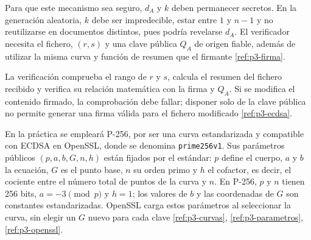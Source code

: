 Para que este mecanismo sea seguro, $d_A$ y $k$ deben permanecer secretos. En la generación aleatoria, $k$ debe ser impredecible, estar entre $1$ y $n-1$ y no reutilizarse en documentos distintos, pues podría revelarse $d_A$. El verificador necesita el fichero, $(r,s)$ y una clave pública $Q_A$ de origen fiable, además de utilizar la misma curva y función de resumen que el firmante \ref{ref:p3-firma}.

La verificación comprueba el rango de $r$ y $s$, calcula el resumen del fichero recibido y verifica su relación matemática con la firma y $Q_A$. Si se modifica el contenido firmado, la comprobación debe fallar; disponer solo de la clave pública no permite generar una firma válida para el fichero modificado \ref{ref:p3-ecdsa}.

En la práctica se empleará P-256, por ser una curva estandarizada y compatible con ECDSA en OpenSSL, donde se denomina \texttt{prime256v1}. Sus parámetros públicos $(p,a,b,G,n,h)$ están fijados por el estándar: $p$ define el cuerpo, $a$ y $b$ la ecuación, $G$ es el punto base, $n$ su orden primo y $h$ el cofactor, es decir, el cociente entre el número total de puntos de la curva y $n$.
En P-256, $p$ y $n$ tienen 256 bits, $a=-3\pmod p$ y $h=1$; los valores de $b$ y las coordenadas de $G$ son constantes estandarizadas.
OpenSSL carga estos parámetros al seleccionar la curva, sin elegir un $G$ nuevo para cada clave \ref{ref:p3-curvas}, \ref{ref:p3-parametros}, \ref{ref:p3-openssl}.

